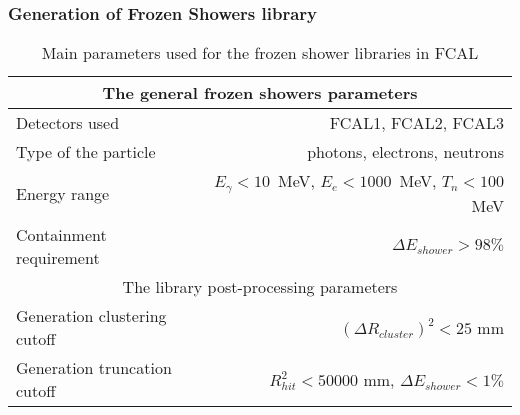 \subsubsection{Generation of Frozen Showers library}

\begin{table}
\centering
\begin{tabular}{l|r}
\hline
\hline
\multicolumn{2}{c}{The general frozen showers parameters} \\
\hline
Detectors used            & FCAL1, FCAL2, FCAL3 \\
Type of the particle      & photons, electrons, neutrons \\
Energy range              &  $E_{\gamma}<10$~MeV,  $E_{e}<1000$~MeV,  $T_n<100$~MeV \\
Containment requirement   & $\Delta E_{shower} > 98\%$\\
\hline
\multicolumn{2}{c}{The library post-processing parameters} \\
\hline
Generation clustering cutoff & $(\Delta R_{cluster})^{2} < 25$ mm\\
Generation truncation cutoff & $R_{hit}^{2} < 50000$ mm, $\Delta E_{shower} < 1\%$\\
\hline
\hline
\end{tabular}
\caption{Main parameters used for the frozen shower libraries in FCAL }
\label{tab:MC_FS_params}
\end{table}

